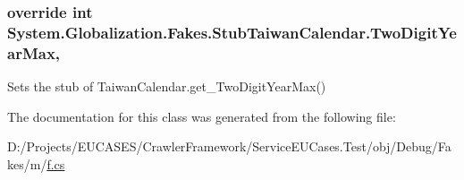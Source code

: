\hypertarget{class_system_1_1_globalization_1_1_fakes_1_1_stub_taiwan_calendar_a9cd944494d9863c97bfa0b229f4434f1}{
\subsubsection[{Two\-Digit\-Year\-Max}]{\setlength{\rightskip}{0pt plus 5cm}override int System.\-Globalization.\-Fakes.\-Stub\-Taiwan\-Calendar.\-Two\-Digit\-Year\-Max\hspace{0.3cm}{\ttfamily [get]}, {\ttfamily [set]}}}\label{class_system_1_1_globalization_1_1_fakes_1_1_stub_taiwan_calendar_a9cd944494d9863c97bfa0b229f4434f1}


Sets the stub of Taiwan\-Calendar.\-get\-\_\-\-Two\-Digit\-Year\-Max()



The documentation for this class was generated from the following file\-:\begin{DoxyCompactItemize}
\item 
D\-:/\-Projects/\-E\-U\-C\-A\-S\-E\-S/\-Crawler\-Framework/\-Service\-E\-U\-Cases.\-Test/obj/\-Debug/\-Fakes/m/\hyperlink{m_2f_8cs}{f.\-cs}\end{DoxyCompactItemize}
